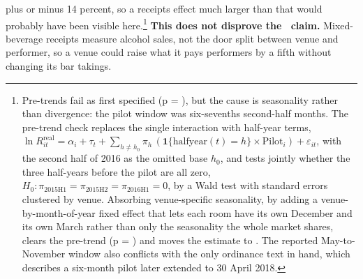 plus or minus 14 percent, so a receipts effect much larger than that would
probably have been visible here.\footnote{Pre-trends fail as first specified (p =
\NQuasiRedriverPretrendP), but the cause is seasonality rather than divergence:
the pilot window was six-sevenths second-half months. The pre-trend check
replaces the single interaction with half-year terms,
\(\ln R^{\mathrm{real}}_{it} = \alpha_i + \tau_t
   + \sum_{h \neq h_0} \pi_h\,(\mathbf{1}\{\mathrm{halfyear}(t) = h\}
   \times \mathrm{Pilot}_i) + \varepsilon_{it}\),
with the second half of 2016 as the omitted base \(h_0\), and tests jointly
whether the three half-years before the pilot are all zero,
\(H_0: \pi_{2015\mathrm{H}1} = \pi_{2015\mathrm{H}2}
   = \pi_{2016\mathrm{H}1} = 0\),
by a Wald test with standard errors clustered by venue. Absorbing
venue-specific seasonality, by adding a venue-by-month-of-year fixed effect
that lets each room have its own December and its own March rather than only
the seasonality the whole market shares, clears the pre-trend (p =
\NQuasiRedriverPretrendPSeasonadj) and moves the estimate to
\NQuasiRedriverDidSeasonadj. The reported May-to-November
window also conflicts with the only ordinance text in hand, which describes a
six-month pilot later extended to 30 April 2018.} \textbf{This does not disprove
the \NQuasiRedriverClaimUnverified\ claim.} Mixed-beverage receipts measure
alcohol sales, not the
door split between venue and performer, so a venue could raise what it pays
performers by a fifth without changing its bar takings.

